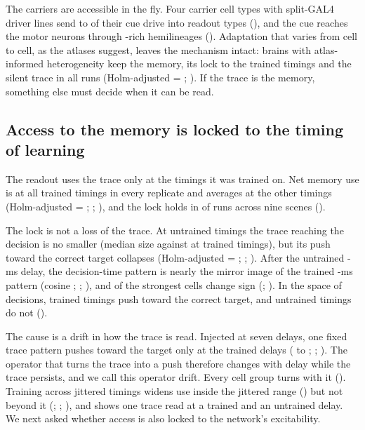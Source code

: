The carriers are accessible in the fly. Four carrier cell types with split-GAL4 driver lines send  to  of
their cue drive into readout types (), and the cue reaches the motor neurons through -rich hemilineages
(). Adaptation that varies from cell to cell, as the atlases suggest, leaves the mechanism intact: brains with
atlas-informed heterogeneity keep the memory, its lock to the trained timings and the silent trace in all  runs
(Holm-adjusted \Pv{} = ; ). If the trace is the memory, something else must decide when it can be read.

\subsection{Access to the memory is locked to the timing of learning}

The readout uses the trace only at the timings it was trained on. Net memory use is  at all  trained timings
in every replicate and averages  at the other timings (Holm-adjusted \Pv{} = ; ; ), and the
lock holds in  of  runs across nine scenes ().

The lock is not a loss of the trace. At untrained timings the trace reaching the decision is no smaller (median size 
against  at trained timings), but its push toward the correct target collapses (Holm-adjusted \Pv{} = ;
; ). After the untrained -ms delay, the decision-time pattern is nearly the mirror image of the
trained -ms pattern (cosine ; ; ), and  of the strongest cells change sign
(; ). In the space of decisions, trained timings push toward the correct target, and untrained timings do not
().

The cause is a drift in how the trace is read. Injected at seven delays, one fixed trace pattern pushes toward the target only at
the trained delays ( to ; ; ). The operator that turns the trace into a push therefore changes
with delay while the trace persists, and we call this operator drift. Every cell group turns with it ().
Training across jittered timings widens use inside the jittered range () but not beyond it (; ; ), and  shows one trace read at a trained
and an untrained delay. We next asked whether access is also locked to the network's excitability.

